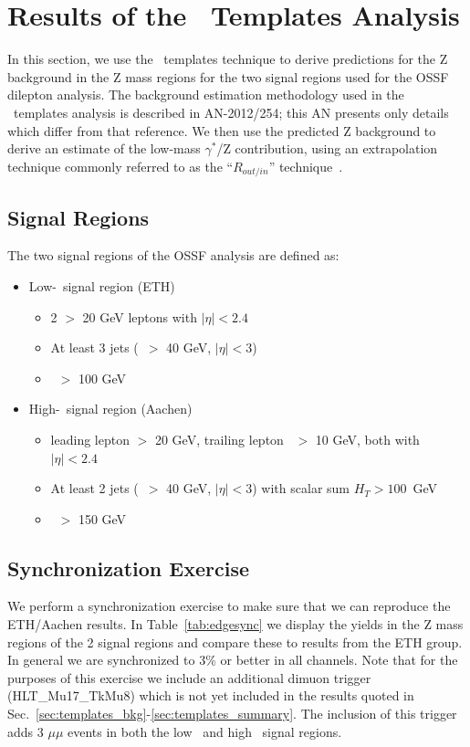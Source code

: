\section{Results of the \MET\ Templates Analysis}
\label{sec:templates}

In this section, we use the \MET\ templates technique to derive predictions for the Z background in the Z mass regions for the 
two signal regions used for the OSSF dilepton analysis. The background estimation methodology used in the \MET\ templates analysis
is described in AN-2012/254; this AN presents only details which differ from that reference. 
We then use the predicted Z background to derive an estimate of the low-mass $\gamma^*$/Z contribution,
using an extrapolation technique commonly referred to as the ``$R_{out/in}$'' technique~\cite{ref:routin}.

\subsection{Signal Regions}

The two signal regions of the OSSF analysis are defined as:

\begin{itemize}
\item Low-\MET\ signal region (ETH)
  \begin{itemize}
  \item 2 \pt $>$ 20 GeV leptons with $|\eta|<2.4$
  \item At least 3 jets (\pt\ $>$ 40 GeV, $|\eta|<3$)
  \item \MET\ $>$ 100 GeV
  \end{itemize}
\item High-\MET\ signal region (Aachen)
  \begin{itemize}
  \item leading lepton \pt $>$ 20 GeV, trailing lepton \pt\ $>$ 10 GeV, both with $|\eta|<2.4$
  \item At least 2 jets (\pt\ $>$ 40 GeV, $|\eta|<3$) with scalar sum $H_{T}>100$~GeV
  \item \MET\ $>$ 150 GeV
  \end{itemize}
\end{itemize}

\subsection{Synchronization Exercise}

We perform a synchronization exercise to make sure that we can reproduce the ETH/Aachen results. In Table~\ref{tab:edgesync} we
display the yields in the Z mass regions of the 2 signal regions and compare these to results from the ETH group.
In general we are synchronized to 3\% or better in all channels. Note that for the purposes of this exercise we include an additional
dimuon trigger (HLT\_Mu17\_TkMu8) which is not yet included in the results quoted in Sec.~\ref{sec:templates_bkg}-\ref{sec:templates_summary}. 
The inclusion of this trigger adds 3 $\mu\mu$ events in both  the low \MET\ and high \MET\ signal regions.

